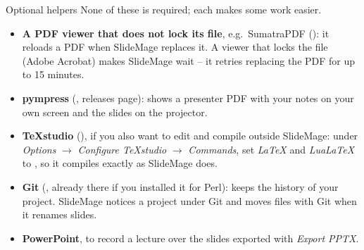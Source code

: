 
\begin{standardframe}{Optional helpers}
	\small
	None of these is required; each makes some work easier.
	\par\medskip
	\begin{itemize}
		\item \textbf{A PDF viewer that does not lock its file}, e.g.\ SumatraPDF (): it reloads a PDF when SlideMage replaces it. A viewer that locks the file (Adobe Acrobat) makes SlideMage wait -- it retries replacing the PDF for up to 15 minutes.
		\item \textbf{pympress} (, releases page): shows a presenter PDF with your notes on your own screen and the slides on the projector.
		\item \textbf{TeXstudio} (), if you also want to edit and compile outside SlideMage: under \emph{Options} $\rightarrow$ \emph{Configure TeXstudio} $\rightarrow$ \emph{Commands}, set \emph{LaTeX} and \emph{LuaLaTeX} to , so it compiles exactly as SlideMage does.
		\item \textbf{Git} (, already there if you installed it for Perl): keeps the history of your project. SlideMage notices a project under Git and moves files with Git when it renames slides.
		\item \textbf{PowerPoint}, to record a lecture over the slides exported with \emph{Export PPTX}.
	\end{itemize}
\end{standardframe}
